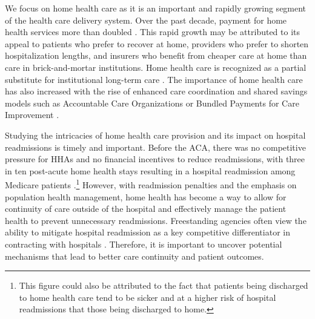 \documentclass[final,12pt, notitlepage]{article}
\begin{document}



We focus on home health care as it is an important and rapidly growing segment of the health care delivery system.
Over the past decade, payment for home health services more than doubled \citep{MedPAC2016hh}.
This rapid growth may be attributed to its appeal to patients who prefer to recover at home, providers who prefer to shorten hospitalization lengths, and insurers who benefit from cheaper care at home than care in brick-and-mortar institutions. Home health care is recognized as a partial substitute for institutional long-term care \citep{Guo2015}. The importance of home health care has also increased with the rise of enhanced care coordination and shared savings models such as Accountable Care Organizations or Bundled Payments for Care Improvement \citep{Sood2011}.

Studying the intricacies of home health care provision and its impact on hospital readmissions is timely and important. Before the ACA, there was no competitive pressure for HHAs and no financial incentives to reduce readmissions, with three in ten post-acute home health stays resulting in a hospital readmission among Medicare patients \citep{MedPAC2014hh}.\footnote{This figure could also be attributed to the fact that patients being discharged to home health care tend to be sicker and at a higher risk of hospital readmissions that those being discharged to home.
}
However, with readmission penalties and the emphasis on population health management, home health has become a way to allow for continuity of care outside of the hospital and effectively manage the patient health to prevent unnecessary readmissions.
Freestanding agencies often view the ability to mitigate hospital readmission as a key competitive differentiator in contracting with hospitals \citep{Worth2014}.
Therefore, it is important to uncover potential mechanisms that lead to better care continuity and patient outcomes.
\end{document}

